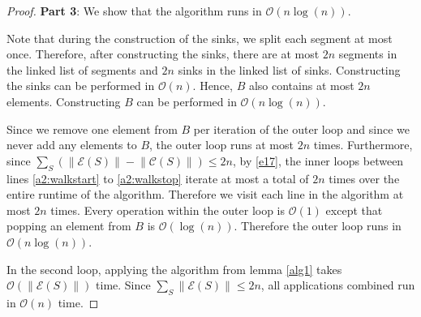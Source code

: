 \documentclass[11pt,a4paper]{article}
\newcommand{\norm}[1]{\left\lVert #1 \right\rVert}
\newcommand{\bO}{\mathcal{O}}
\begin{document}
\begin{proof}
\textbf{Part 3}: We show that the algorithm runs in $\bO(n\log(n))$.

Note that during the construction of the sinks, we split each segment at most once.
Therefore, after constructing the sinks, there are at most $2n$ segments in the linked list of segments and $2n$ sinks in the linked list of sinks.
Constructing the sinks can be performed in $\bO(n)$.
Hence, $B$ also contains at most $2n$ elements.
Constructing $B$ can be performed in $\bO(n\log(n))$.

Since we remove one element from $B$ per iteration of the outer loop and since we never add any elements to $B$, the outer loop runs at most $2n$ times.
Furthermore, since $\sum_S\left(\norm{\mathcal{E}(S)} - \norm{\mathcal{C}(S)}\right) \le 2n$, by \ref{e17}, the inner loops between lines \ref{a2:walkstart} to \ref{a2:walkstop} iterate at most a total of $2n$ times over the entire runtime of the algorithm.
Therefore we visit each line in the algorithm at most $2n$ times.
Every operation within the outer loop is $\bO(1)$ except that popping an element from $B$ is $\bO(\log(n))$.
Therefore the outer loop runs in $\bO(n\log(n))$.

In the second loop, applying the algorithm from lemma \ref{alg1} takes $\bO(\norm{\mathcal{E}(S)})$ time.
Since $\sum_S\norm{\mathcal{E}(S)}\le 2n$, all applications combined run in $\bO(n)$ time.
\end{proof}
\end{document}
